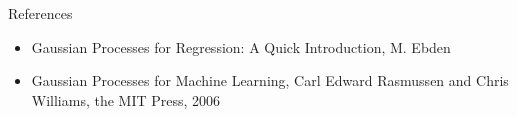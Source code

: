\begin{frame}{References}
    \begin{itemize}
        \item Gaussian Processes for Regression: A Quick Introduction, M. Ebden
        \item Gaussian Processes for Machine Learning, Carl Edward Rasmussen and Chris Williams, the MIT Press, 2006 
        \end{itemize}
\end{frame}




